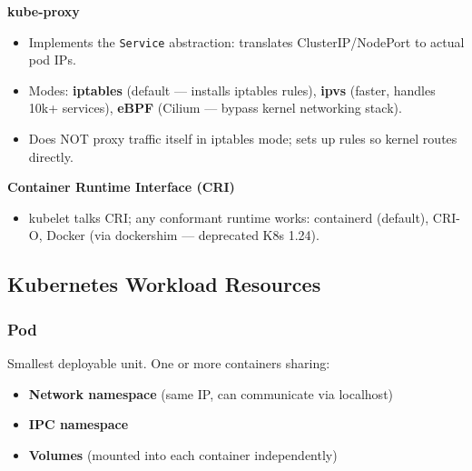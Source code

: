 \documentclass[11pt]{article}
\providecommand{\tightlist}{\setlength{\itemsep}{1pt}\setlength{\parskip}{0pt}}
\begin{document}
\textbf{kube-proxy}

\begin{itemize}
\tightlist
\item
  Implements the \texttt{Service} abstraction: translates ClusterIP/NodePort to actual pod IPs.
\item
  Modes: \textbf{iptables} (default --- installs iptables rules), \textbf{ipvs} (faster, handles 10k+ services), \textbf{eBPF} (Cilium --- bypass kernel networking stack).
\item
  Does NOT proxy traffic itself in iptables mode; sets up rules so kernel routes directly.
\end{itemize}

\textbf{Container Runtime Interface (CRI)}

\begin{itemize}
\tightlist
\item
  kubelet talks CRI; any conformant runtime works: containerd (default), CRI-O, Docker (via dockershim --- deprecated K8s 1.24).
\end{itemize}

\subsection{Kubernetes Workload Resources}\label{kubernetes-workload-resources}

\subsubsection{Pod}\label{pod}

Smallest deployable unit. One or more containers sharing:

\begin{itemize}
\tightlist
\item
  \textbf{Network namespace} (same IP, can communicate via localhost)
\item
  \textbf{IPC namespace}
\item
  \textbf{Volumes} (mounted into each container independently)
\end{itemize}

\end{document}
